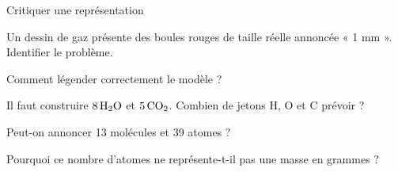 \par\noindent\begin{minipage}{\linewidth}
\begin{exercice}[3]{Critiquer une représentation}
\begin{questions}
\item Un dessin de gaz présente des boules rouges de taille réelle annoncée « 1 mm ». Identifier le problème.
\item Comment légender correctement le modèle ?
\end{questions}
\end{exercice}
\end{minipage}
\label{defi-ex-5}
\begin{questions}
\item Il faut construire $8\,\ce{H2O}$ et $5\,\ce{CO2}$. Combien de jetons H, O et C prévoir ?
\item Peut-on annoncer 13 molécules et 39 atomes ?
\item Pourquoi ce nombre d’atomes ne représente-t-il pas une masse en grammes ?
\end{questions}
\pcGrille

